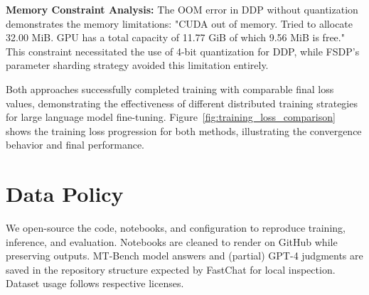 \documentclass{assignment7_report}
\begin{document}
\textbf{Memory Constraint Analysis:}
The OOM error in DDP without quantization demonstrates the memory limitations: "CUDA out of memory. Tried to allocate 32.00 MiB. GPU has a total capacity of 11.77 GiB of which 9.56 MiB is free." This constraint necessitated the use of 4-bit quantization for DDP, while FSDP's parameter sharding strategy avoided this limitation entirely.

Both approaches successfully completed training with comparable final loss values, demonstrating the effectiveness of different distributed training strategies for large language model fine-tuning. Figure~\ref{fig:training_loss_comparison} shows the training loss progression for both methods, illustrating the convergence behavior and final performance.

\section{Data Policy}
\vspace*{-3mm}

We open-source the code, notebooks, and configuration to reproduce training, inference, and evaluation. Notebooks are cleaned to render on GitHub while preserving outputs. MT-Bench model answers and (partial) GPT-4 judgments are saved in the repository structure expected by FastChat for local inspection. Dataset usage follows respective licenses.







\end{document}
